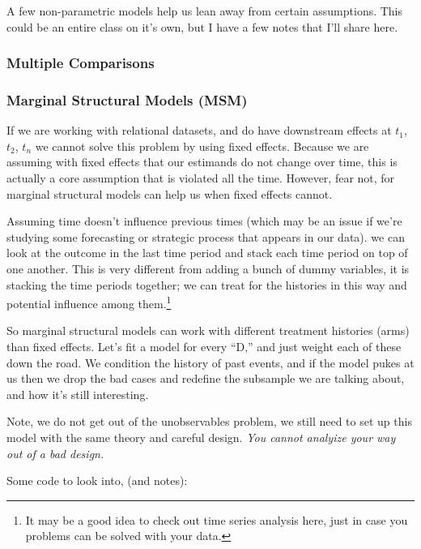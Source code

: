 \documentclass[12pt]{article}\usepackage[]{graphicx}\usepackage[]{color}
\begin{document}
\begin{flushleft}
A few non-parametric models help us lean away from certain assumptions. This could be an entire class on it's own, but I have a few notes that I'll share here.


\subsubsection{Multiple Comparisons}


\subsubsection{Marginal Structural Models (MSM)}

If we are working with relational datasets, and do have downstream effects at $t_1$, $t_2$, $t_n$ we cannot solve this problem by using fixed effects. Because we are assuming with fixed effects that our estimands do not change over time, this is actually a core assumption that is violated all the time. However, fear not, for marginal structural models can help us when fixed effects cannot.

Assuming time doesn't influence previous times (which may be an issue if we're studying some forecasting or strategic process that appears in our data). we can look at the outcome in the last time period and stack each time period on top of one another. This is very different from adding a bunch of dummy variables, it is stacking the time periods together; we can treat for the histories in this way and potential influence among them.\footnote{It may be a good idea to check out time series analysis here, just in case you problems can be solved with your data.}

So marginal structural models can work with different treatment histories (arms) than fixed effects. Let's fit a model for every ``D,'' and just weight each of these down the road. We condition the history of past events, and if the model pukes at us then we drop the bad cases and redefine the subsample we are talking about, and how it's still interesting.

Note, we do not get out of the unobservables problem, we still need to set up this model with the same theory and careful design. \textit{You cannot analyize your way out of a bad design. }

Some code to look into, (and notes):


\end{flushleft}
\end{document}
